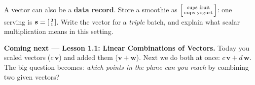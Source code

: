 \documentclass[10pt]{article}
\newcommand{\vv}{\mathbf{v}}
\newcommand{\ww}{\mathbf{w}}
\begin{document}
\begin{extensionbox}
A vector can also be a \textbf{data record}. Store a smoothie as
$\begin{bsmallmatrix} \text{cups fruit} \\ \text{cups yogurt} \end{bsmallmatrix}$: one
serving is $\mathbf{s}=\begin{bsmallmatrix} 2 \\ 1 \end{bsmallmatrix}$. Write the vector for a
\emph{triple} batch, and explain what scalar multiplication means in this setting.
\end{extensionbox}

\begin{spiralbox}
\textbf{Coming next --- Lesson 1.1: Linear Combinations of Vectors.} Today you scaled
vectors ($c\,\vv$) and added them ($\vv+\ww$). Next we do both at once: $c\,\vv + d\,\ww$.
The big question becomes: \emph{which points in the plane can you reach} by combining two
given vectors?
\end{spiralbox}
\end{document}
